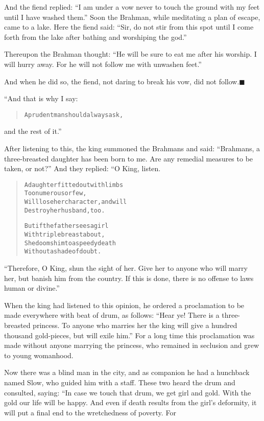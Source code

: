 \documentclass[article, twoside, 14pt]{memoir}
\newcommand{\qed}{\hfill \ensuremath{\blacksquare}}
\renewenvironment{verbatim}{%
\begin{quote}%
\vskip -10pt%
\begin{alltt}\normalfont\large}{\end{alltt}%
\end{quote}%
\vskip -10pt
} %
\begin{document}
And the fiend replied:
``I am under a vow never to touch the ground with my feet until I have washed them.''
Soon the Brahman, while meditating a plan of escape, came to
a lake. Here the fiend said:
``Sir, do not stir from this spot until I come forth from the lake after bathing and worshiping the god.''

Thereupon the Brahman thought:
``He will be sure to eat me after his worship. I will hurry away. For he will not follow me with unwashen feet.''

And when he did so, the fiend, not daring to break his vow, did not
follow.\hyperref[s90]{\qed}

“And that is why I say:

\begin{verbatim}
A prudent man should always ask,
\end{verbatim}
and the rest of it.”

After listening to this, the king summoned the Brahmans and said:
``Brahmans, a three-breasted daughter has been born to me. Are any remedial measures to be taken, or not?''
And they replied: “O King, listen.

\begin{verbatim}
A daughter fitted out with limbs
    Too numerous or few,
Will lose her character, and will
    Destroy her husband, too.

But if the father sees a girl
    With triple breast about,
She dooms him to a speedy death
    Without a shade of doubt.
\end{verbatim}
``Therefore, O King, shun the sight of her. Give her to anyone who will marry her, but banish him from the country. If this is done, there is no offense to laws human or divine.''

When the king had listened to this opinion, he ordered a
proclamation to be made everywhere with beat of drum, as follows:
``Hear ye! There is a three-breasted princess. To anyone who marries her the king will give a hundred thousand gold-pieces, but will exile him.''
For a long time this proclamation was made without anyone marrying
the princess, who remained in seclusion and grew to young
womanhood.

Now there was a blind man in the city, and as companion he
had a hunchback named Slow, who guided him with a staff. These two
heard the drum and consulted, saying: “In case we touch that drum,
we get girl and gold. With the gold our life will be happy. And
even if death results from the girl's deformity, it will put a
final end to the wretchedness of poverty. For
\end{document}
